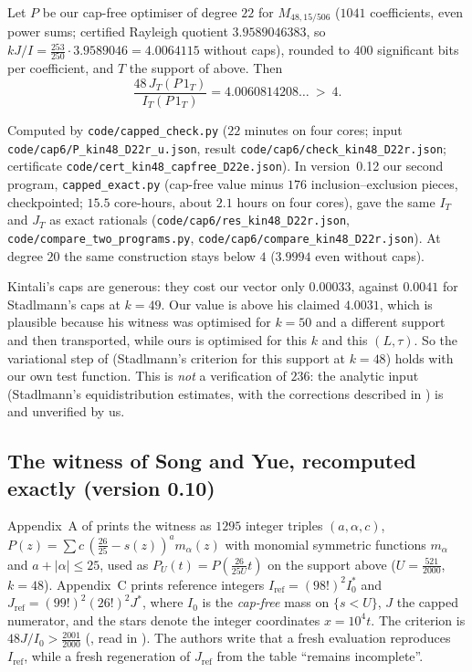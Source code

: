 \begin{proposition}\label{prop:kin-capped}
Let $P$ be our cap-free optimiser of degree $22$ for $M_{48,15/506}$ ($1041$
coefficients, even power sums; certified Rayleigh quotient $3.9589046383$, so
$kJ/I=\frac{253}{250}\cdot3.9589046=4.0064115$ without caps), rounded to
$400$ significant bits per coefficient, and $T$ the support of \cite{Kin26}
above. Then
\[
\frac{48\,J_T(P\,1_T)}{I_T(P\,1_T)}=4.0060814208\ldots\ >\ 4 .
\]
\end{proposition}
\begin{sloppypar}
Computed by \texttt{code/capped\_check.py} ($22$ minutes on four cores; input
\texttt{code/cap6/P\_kin48\_D22r\_u.json}, result
\texttt{code/cap6/check\_kin48\_D22r.json}; certificate
\texttt{code/cert\_kin48\_capfree\_D22e.json}). In version~0.12 our second program, \texttt{capped\_exact.py}
(cap-free value minus $176$ inclusion--exclusion pieces, checkpointed;
$15.5$ core-hours, about $2.1$ hours on four cores), gave the same $I_T$ and
$J_T$ as exact rationals (\texttt{code/cap6/res\_kin48\_D22r.json},
\texttt{code/compare\_two\_programs.py},
\texttt{code/cap6/compare\_kin48\_D22r.json}).
At degree $20$ the
same construction stays below $4$ ($3.9994$ even without caps).
\end{sloppypar}
Kintali's caps are generous: they cost our vector only $0.00033$, against
$0.0041$ for Stadlmann's caps at $k=49$. Our value is above his claimed
$4.0031$, which is plausible because his witness was optimised for $k=50$
and a different support and then transported, while ours is optimised for
this $k$ and this $(L,\tau)$. So the variational step of \cite{Kin26}
(Stadlmann's criterion for this support at $k=48$) holds with our own test
function. This is \emph{not} a verification of $236$: the analytic input
(Stadlmann's equidistribution estimates, with the corrections described in
\cite{Kin26}) is  and unverified by us.

\subsection*{The witness of Song and Yue, recomputed exactly (version 0.10)}
Appendix~A of \cite{SY26} prints the witness as $1295$ integer triples
$(a,\alpha,c)$, $P(z)=\sum c\,(\frac{26}{25}-s(z))^{a}m_\alpha(z)$ with
monomial symmetric functions $m_\alpha$ and $a+|\alpha|\le25$, used as
$P_U(t)=P(\frac{26}{25U}t)$ on the support above ($U=\frac{521}{2000}$, $k=48$).
Appendix~C prints reference integers $I_{\mathrm{ref}}=(98!)^2I_0^{*}$ and
$J_{\mathrm{ref}}=(99!)^2(26!)^2J^{*}$, where $I_0$ is the \emph{cap-free}
mass on $\{s<U\}$, $J$ the capped numerator, and the stars denote the integer
coordinates $x=10^4t$. The criterion is $48J/I_0>\frac{2001}{2000}$
(, read in \cite[\S4.12, App.~C]{SY26}). The authors write
that a fresh evaluation reproduces $I_{\mathrm{ref}}$, while a fresh
regeneration of $J_{\mathrm{ref}}$ from the table ``remains incomplete''.

